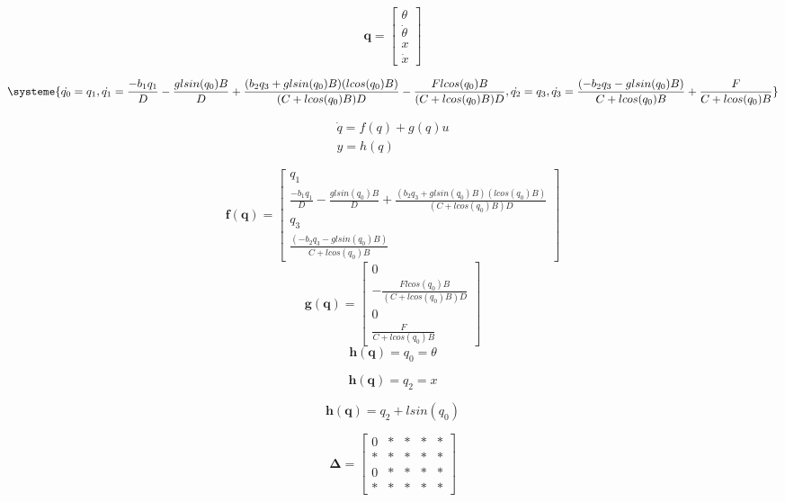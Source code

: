 \documentclass[a4paper]{article}
\begin{document}
\begin{equation}
\mathbf{q} =
\left[ \begin{array}{ccc}
\theta \\
\dot{\theta}\\
x \\
\dot{x}
\end{array} \right]
\end{equation}

\[
\systeme{
\dot{q_0} = q_1,
\dot{q_1} = \frac{-b_1 q_1}{D} - \frac{glsin(q_0)B}{D} + \frac{(b_2 q_3  + glsin(q_0)B) (lcos(q_0)B)}{(C + lcos(q_0)B)D} - \frac{F lcos(q_0)B}{(C + lcos(q_0)B)D},
\dot{q_2} = q_3,
\dot{q_3} =  \frac{(-b_2 q_3  - glsin(q_0)B)}{C + lcos(q_0)B} + \frac{F}{C + lcos(q_0)B}
}
\]

\begin{gather}
\dot{q} = f(q) + g(q)u \\
y = h(q)
\end{gather}

\begin{equation}
\mathbf{f(q)} =
\left[ \begin{array}{ccc}
q_1 \\
\frac{-b_1 q_1}{D} - \frac{glsin(q_0)B}{D} + \frac{(b_2 q_3  + glsin(q_0)B) (lcos(q_0)B)}{(C + lcos(q_0)B)D}  \\
q_3 \\
\frac{(-b_2 q_3  - glsin(q_0)B)}{C + lcos(q_0)B}
\end{array} \right]
\end{equation}
\begin{equation}
\mathbf{g(q)} =
\left[ \begin{array}{ccc}
0 \\
- \frac{F lcos(q_0)B}{(C + lcos(q_0)B)D} \\
0 \\
\frac{F}{C + lcos(q_0)B}
\end{array} \right]
\end{equation}
\begin{equation}
\mathbf{h(q)} =
q_0 = \theta
\end{equation}

\begin{equation}
\mathbf{h(q)} =
q_2 = x
\end{equation}

\begin{equation}
\mathbf{h(q)} =
q_2 + l sin(q_0)
\end{equation}

\begin{equation}
\mathbf{\Delta} =
\left[ \begin{array}{ccccc}
0 & * & * & * & *\\
* & * & * & * & *\\
0 & * & * & * & *\\
* & * & * & * & *
\end{array} \right]
\end{equation}
\end{document}
